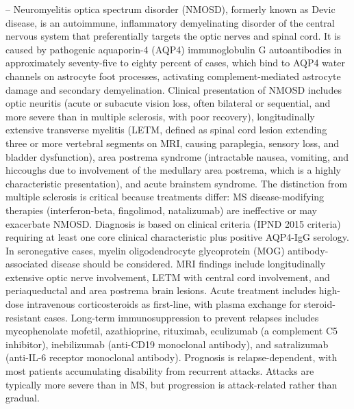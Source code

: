 -- Neuromyelitis optica spectrum disorder (NMOSD), formerly known as Devic disease, is an autoimmune, inflammatory demyelinating disorder of the central nervous system that preferentially targets the optic nerves and spinal cord. It is caused by pathogenic aquaporin-4 (AQP4) immunoglobulin G autoantibodies in approximately seventy-five to eighty percent of cases, which bind to AQP4 water channels on astrocyte foot processes, activating complement-mediated astrocyte damage and secondary demyelination. Clinical presentation of NMOSD includes optic neuritis (acute or subacute vision loss, often bilateral or sequential, and more severe than in multiple sclerosis, with poor recovery), longitudinally extensive transverse myelitis (LETM, defined as spinal cord lesion extending three or more vertebral segments on MRI, causing paraplegia, sensory loss, and bladder dysfunction), area postrema syndrome (intractable nausea, vomiting, and hiccoughs due to involvement of the medullary area postrema, which is a highly characteristic presentation), and acute brainstem syndrome. The distinction from multiple sclerosis is critical because treatments differ: MS disease-modifying therapies (interferon-beta, fingolimod, natalizumab) are ineffective or may exacerbate NMOSD. Diagnosis is based on clinical criteria (IPND 2015 criteria) requiring at least one core clinical characteristic plus positive AQP4-IgG serology. In seronegative cases, myelin oligodendrocyte glycoprotein (MOG) antibody-associated disease should be considered. MRI findings include longitudinally extensive optic nerve involvement, LETM with central cord involvement, and periaqueductal and area postrema brain lesions. Acute treatment includes high-dose intravenous corticosteroids as first-line, with plasma exchange for steroid-resistant cases. Long-term immunosuppression to prevent relapses includes mycophenolate mofetil, azathioprine, rituximab, eculizumab (a complement C5 inhibitor), inebilizumab (anti-CD19 monoclonal antibody), and satralizumab (anti-IL-6 receptor monoclonal antibody). Prognosis is relapse-dependent, with most patients accumulating disability from recurrent attacks. Attacks are typically more severe than in MS, but progression is attack-related rather than gradual.

